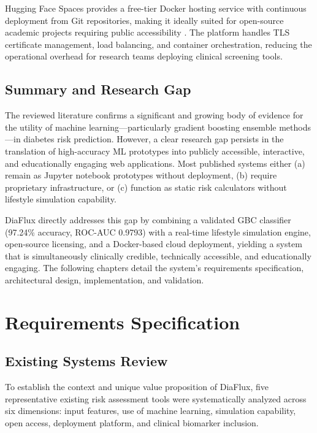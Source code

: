 \documentclass[12pt,a4paper]{report}
\begin{document}
Hugging Face Spaces provides a free-tier Docker hosting service with continuous deployment from Git repositories, making it ideally suited for open-source academic projects requiring public accessibility \cite{hf_spaces}. The platform handles TLS certificate management, load balancing, and container orchestration, reducing the operational overhead for research teams deploying clinical screening tools.

\section{Summary and Research Gap}
The reviewed literature confirms a significant and growing body of evidence for the utility of machine learning---particularly gradient boosting ensemble methods---in diabetes risk prediction. However, a clear research gap persists in the translation of high-accuracy ML prototypes into publicly accessible, interactive, and educationally engaging web applications. Most published systems either (a) remain as Jupyter notebook prototypes without deployment, (b) require proprietary infrastructure, or (c) function as static risk calculators without lifestyle simulation capability.

DiaFlux directly addresses this gap by combining a validated GBC classifier (97.24\% accuracy, ROC-AUC 0.9793) with a real-time lifestyle simulation engine, open-source licensing, and a Docker-based cloud deployment, yielding a system that is simultaneously clinically credible, technically accessible, and educationally engaging. The following chapters detail the system's requirements specification, architectural design, implementation, and validation.

\clearpage

\chapter{Requirements Specification}

\section{Existing Systems Review}
To establish the context and unique value proposition of DiaFlux, five representative existing risk assessment tools were systematically analyzed across six dimensions: input features, use of machine learning, simulation capability, open access, deployment platform, and clinical biomarker inclusion.
\end{document}
